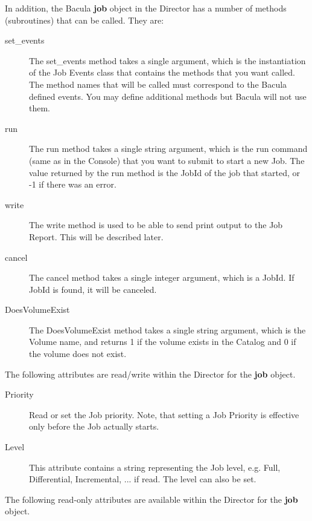 In addition, the Bacula {\bf job} object in the Director has
a number of methods (subroutines) that can be called. They
are:
\begin{description}
\item [set\_events] The set\_events method takes a single
   argument, which is the instantiation of the Job Events class
   that contains the methods that you want called. The method
   names that will be called must correspond to the Bacula
   defined events. You may define additional methods but Bacula
   will not use them.
\item [run] The run method takes a single string
   argument, which is the run command (same as in the Console)
   that you want to submit to start a new Job. The value
   returned by the run method is the JobId of the job that
   started, or -1 if there was an error.
\item [write] The write method is used to be able to send
   print output to the Job Report. This will be described later.
\item[cancel] The cancel method takes a single integer argument,
   which is a JobId. If JobId is found, it will be canceled.
\item [DoesVolumeExist] The DoesVolumeExist method takes a single
   string argument, which is the Volume name, and returns 
   1 if the volume exists in the Catalog and 0 if the volume
   does not exist.
\end{description}

The following attributes are read/write within the Director 
for the {\bf job} object.

\begin{description}
\item [Priority] Read or set the Job priority.
   Note, that setting a Job Priority is effective only before
   the Job actually starts.
\item [Level] This attribute contains a string representing the Job 
        level, e.g. Full, Differential, Incremental, ... if read.
        The level can also be set.
\end{description}

The following read-only attributes are available within the Director
for the {\bf job} object.

